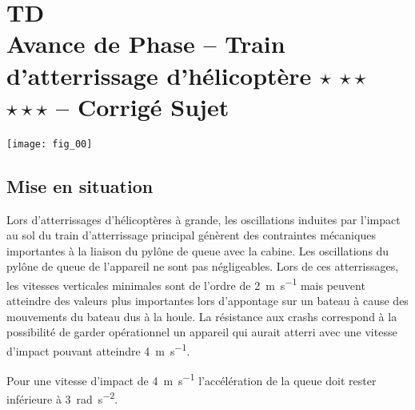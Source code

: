 \chapter*{TD  \\ 
Avance de Phase -- Train d’atterrissage d'hélicoptère \ifnormal $\star$ \else \fi \ifdifficile $\star\star$ \else \fi \iftdifficile $\star\star\star$ \else \fi  -- 
\ifprof Corrigé \else Sujet \fi}

\iflivret {} \else
\ifprof  {} \else \fi
\fi

\setcounter{question}{0}

\begin{marginfigure} [4cm]
\texttt{[image: fig\_00]}
\end{marginfigure}



\section*{Mise en situation}
\ifprof
\else
Lors d’atterrissages d'hélicoptères à grande, les oscillations induites par l'impact au sol du train
d'atterrissage principal génèrent des contraintes mécaniques importantes à la liaison du pylône de queue avec
la cabine. Les oscillations du pylône de queue de l’appareil ne sont pas négligeables.
Lors de ces atterrissages, les vitesses verticales minimales sont de l’ordre de \SI{2}{m.s^{-1}} mais peuvent atteindre des valeurs plus importantes lors d’appontage sur un bateau à cause des mouvements du bateau dus à la houle.
La résistance aux crashs correspond à la possibilité de garder opérationnel un appareil qui aurait atterri avec
une vitesse d'impact pouvant atteindre \SI{4}{m.s^{-1}}.
\fi
\begin{obj}
Pour une vitesse d'impact de \SI{4}{m.s^{-1}} l'accélération de la queue doit rester inférieure à \SI{3}{rad.s^{-2}}.
\end{obj}

